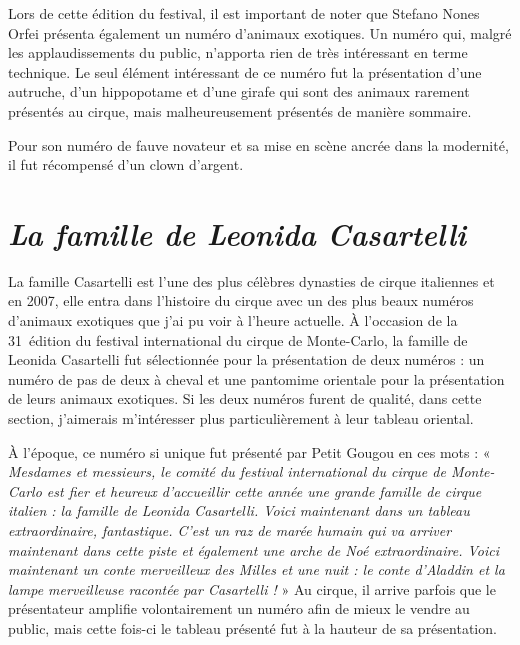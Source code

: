 Lors de cette édition du festival, il est important de noter que Stefano Nones Orfei présenta également un numéro d’animaux exotiques. Un numéro qui, malgré les applaudissements du public, n’apporta rien de très intéressant en terme technique. Le seul élément intéressant de ce numéro fut la présentation d’une autruche, d’un hippopotame et d’une girafe qui sont des animaux rarement présentés au cirque, mais malheureusement présentés de manière sommaire.

Pour son numéro de fauve novateur et sa mise en scène ancrée dans la modernité, il fut récompensé d’un clown d’argent.

\section*{\textit{La famille de Leonida Casartelli}}
{}
\noindent
La famille Casartelli est l'une des plus célèbres dynasties de cirque italiennes et en 2007, elle entra dans l'histoire du cirque avec un des plus beaux numéros d'animaux exotiques que j'ai pu voir à l'heure actuelle. À l’occasion de la 31\ieme~édition du festival international du cirque de Monte-Carlo, la famille de Leonida Casartelli fut sélectionnée pour la présentation de deux numéros : un numéro de pas de deux à cheval et une pantomime orientale pour la présentation de leurs animaux exotiques. Si les deux numéros furent de qualité, dans cette section, j'aimerais m’intéresser plus particulièrement à leur tableau oriental.

À l’époque, ce numéro si unique fut présenté par Petit Gougou en ces mots : «\textit{ Mesdames et messieurs, le comité du festival international du cirque de Monte-Carlo est fier et heureux d’accueillir cette année une grande famille de cirque italien : la famille de Leonida Casartelli. Voici maintenant dans un tableau extraordinaire, fantastique. C’est un raz de marée humain qui va arriver maintenant dans cette piste et également une arche de Noé extraordinaire. Voici maintenant un conte merveilleux des Milles et une nuit : le conte d’Aladdin et la lampe merveilleuse racontée par Casartelli !} » Au cirque, il arrive parfois que le présentateur amplifie volontairement un numéro afin de mieux le vendre au public, mais cette fois-ci le tableau présenté fut à la hauteur de sa présentation. 

